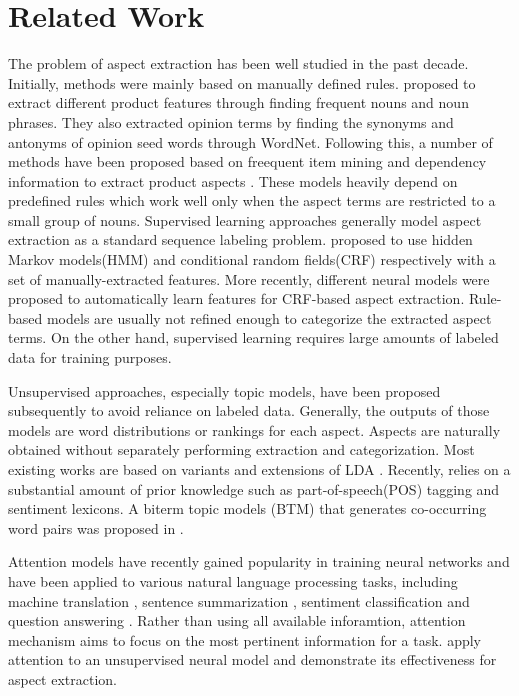 \documentclass{article}
\begin{document}
\section{Related Work}
\label{sec:related}
The problem of aspect extraction has been well studied in the past decade. Initially, methods were mainly based on manually defined rules. \cite{HuLiu2004} proposed to extract different product features through finding frequent nouns and noun phrases. They also extracted opinion terms by finding the synonyms and antonyms of opinion seed words through WordNet. Following this, a number of methods have been proposed based on freequent item mining and dependency information to extract product aspects \cite{Zhuang2006}
\cite{Somasundarn2009} \cite{Qiu2011}. These models heavily depend on predefined rules which work well only when the aspect terms are restricted to a small group of nouns. Supervised learning approaches generally model aspect extraction as a standard sequence labeling problem. \cite{Jin2009} \cite{Li2010} proposed to use hidden Markov models(HMM) and conditional random fields(CRF) respectively with a set of manually-extracted features. More recently, different neural models \cite{Yin2016} \cite{Wang2016} were proposed to automatically learn features for CRF-based aspect extraction. Rule-based models are usually not refined enough to categorize the extracted aspect terms. On the other hand, supervised learning requires large amounts of labeled data for training purposes.

Unsupervised approaches, especially topic models, have been proposed subsequently to avoid reliance on labeled data. Generally, the outputs of those models are word distributions or rankings for each aspect. Aspects are naturally obtained without separately performing extraction and categorization. Most existing works \cite{Brody2010UAS} \cite{Zhao2010JMA} \cite{Mukherjee2012} \cite{Chen2014} are based on variants and extensions of LDA
\cite{Blei2003}. Recently, \cite{Wang2015} relies on a substantial amount of prior knowledge such as part-of-speech(POS) tagging and sentiment lexicons. A biterm topic models (BTM) that generates co-occurring word pairs was proposed in \cite{Yan2013}.

Attention models \cite{Mnih2014} have recently gained popularity in training neural networks and have been applied to various natural language processing tasks, including machine translation \cite{Bahdanau2015NMT}, sentence summarization \cite{Rush2015}, sentiment classification \cite{Chen2016} and question answering \cite{Herman2015}. Rather than using all available inforamtion, attention mechanism aims to focus on the most pertinent information for a task. \cite{He2018ABAE} apply attention to an unsupervised neural model and demonstrate its effectiveness for aspect extraction.
\end{document}
